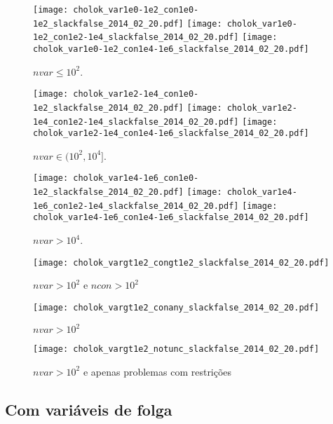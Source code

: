 \documentclass{article}
\begin{document}
\begin{figure}[H]
\centering
\texttt{[image: cholok\_var1e0-1e2\_con1e0-1e2\_slackfalse\_2014\_02\_20.pdf]}
\texttt{[image: cholok\_var1e0-1e2\_con1e2-1e4\_slackfalse\_2014\_02\_20.pdf]}
\texttt{[image: cholok\_var1e0-1e2\_con1e4-1e6\_slackfalse\_2014\_02\_20.pdf]}
\caption{ $nvar \leq 10^2$. }
\label{fig:nvar_small}
\end{figure}
\begin{figure}[H]
\centering
\texttt{[image: cholok\_var1e2-1e4\_con1e0-1e2\_slackfalse\_2014\_02\_20.pdf]}
\texttt{[image: cholok\_var1e2-1e4\_con1e2-1e4\_slackfalse\_2014\_02\_20.pdf]}
\texttt{[image: cholok\_var1e2-1e4\_con1e4-1e6\_slackfalse\_2014\_02\_20.pdf]}
\caption{ $nvar \in (10^2,10^4]$. }
\label{fig:nvar_medium}
\end{figure}
\begin{figure}[H]
\centering
\texttt{[image: cholok\_var1e4-1e6\_con1e0-1e2\_slackfalse\_2014\_02\_20.pdf]}
\texttt{[image: cholok\_var1e4-1e6\_con1e2-1e4\_slackfalse\_2014\_02\_20.pdf]}
\texttt{[image: cholok\_var1e4-1e6\_con1e4-1e6\_slackfalse\_2014\_02\_20.pdf]}
\caption{ $nvar > 10^4$. }
\label{fig:nvar_big}
\end{figure}

\begin{figure}[H]
\centering
\texttt{[image: cholok\_vargt1e2\_congt1e2\_slackfalse\_2014\_02\_20.pdf]}
\caption{ $nvar > 10^2$ e $ncon > 10^2$ }
\label{fig:both_medium_and_big}
\end{figure}

\begin{figure}[H]
\centering
\texttt{[image: cholok\_vargt1e2\_conany\_slackfalse\_2014\_02\_20.pdf]}
\caption{ $nvar > 10^2$ }
\label{fig:nvar_medium_and_big}
\end{figure}

\begin{figure}[H]
\centering
\texttt{[image: cholok\_vargt1e2\_notunc\_slackfalse\_2014\_02\_20.pdf]}
\caption{ $nvar > 10^2$ e apenas problemas com restrições }
\label{fig:nvar_medium_and_big_not_unc}
\end{figure}

\newpage
\subsection{Com variáveis de folga}
\end{document}
